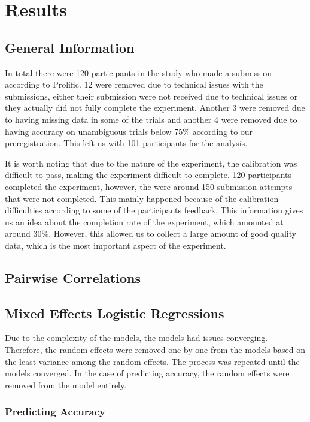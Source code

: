 ﻿\chapter{Results}
\label{chap:results}

\section{General Information}
\label{sec:general_info}
In total there were 120 participants in the study who made a submission according to Prolific. 12 were removed due to technical issues with the submissions, either their submission were not received due to technical issues or they actually did not fully complete the experiment. Another 3 were removed due to having missing data in some of the trials and another 4 were removed due to having accuracy on unambiguous trials below 75\% according to our preregistration. This left us with 101 participants for the analysis. 

It is worth noting that due to the nature of the experiment, the calibration was difficult to pass, making the experiment difficult to complete. 120 participants completed the experiment, however, the were around 150 submission attempts that were not completed. This mainly happened because of the calibration difficulties according to some of the participants feedback. This information gives us an idea about the completion rate of the experiment, which amounted at around 30\%. However, this allowed us to collect a large amount of good quality data, which is the most important aspect of the experiment.


\section{Pairwise Correlations}
\label{sec:pairwise_corr}

\section{Mixed Effects Logistic Regressions}
\label{sec:mixed_effects_models}
Due to the complexity of the models, the models had issues converging. Therefore, the random effects were removed one by one from the models based on the least variance among the random effects. The process was repeated until the models converged. In the case of predicting accuracy, the random effects were removed from the model entirely. 


\subsection{Predicting Accuracy}
\label{sec:accuracy_model}

